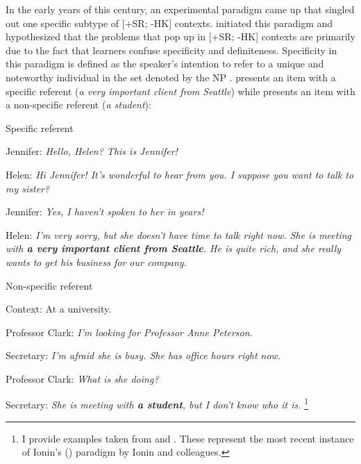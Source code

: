 \documentclass[output=paper,
modfonts
]{langscibook}
\begin{document}
In the early years of this century, an experimental paradigm came up that singled out one specific subtype of [+SR; -HK] contexts. \citet{Ionin2003} initiated this paradigm and hypothesized that the problems that pop up in [+SR; -HK] contexts are primarily due to the fact that learners confuse specificity and definiteness. Specificity in this paradigm is defined as the speaker’s intention to refer to a unique and noteworthy individual in the set denoted by the NP \citep{IoninKoWexler2004}.  presents an item with a specific referent (\textit{a very important client from Seattle}) while  presents an item with a non-specific referent (\textit{a student}):

\ea\label{ex:lebruyn:1} {Specific referent}

Jennifer: \textit{Hello, Helen? This is Jennifer!}

Helen: \textit{Hi Jennifer! It’s wonderful to hear from you. I suppose you want to talk to my sister?}

Jennifer: \textit{Yes, I haven’t spoken to her in years!}

Helen: \textit{I’m very sorry, but she doesn’t have time to talk right now. She is meeting with \textbf{a very important client from Seattle}. He is quite rich, and she really wants to get his business for our company.} \citep[239]{KoIoninWexler2010}
\z

\ea\label{ex:lebruyn:2} {Non-specific referent}

Context: At a university.

Professor Clark: \textit{I’m looking for Professor Anne Peterson.}

Secretary: \textit{I’m afraid she is busy. She has office hours right now.}

Professor Clark: \textit{What is she doing?}

Secretary: \textit{She is meeting with \textbf{a student}, but I don’t know who it is.} \citep[68]{IoninKoWexler2004}\footnote{I provide examples taken from \citet{KoIoninWexler2010} and \citet{IoninKoWexler2004}. These represent the most recent instance of Ionin’s (\citeyear{Ionin2003}) paradigm by Ionin and colleagues.} 
\z
\end{document}
